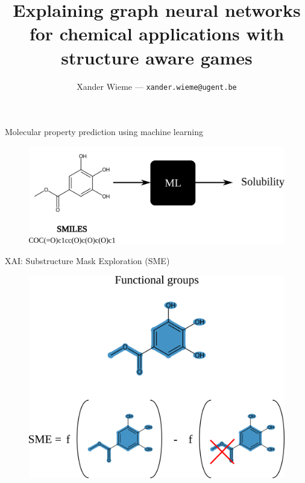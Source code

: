 \documentclass[aspectratio=169]{beamer}
\title{Explaining graph neural networks for chemical applications with structure aware games}
\subtitle{}
\author[DB]{Xander Wieme --- \texttt{xander.wieme@ugent.be}}
\date{}
\begin{document}

\logoframe

\titleframe



\begin{frame}{Molecular property prediction using machine learning}

    \begin{figure}[h]
        \centering 
        \includegraphics[scale=0.85]{./img/mpp.png}
    \end{figure}
   
\end{frame}


\begin{frame}{XAI: Substructure Mask Exploration (SME)}

    \begin{figure}[h]
        \centering 
        \includegraphics[scale=0.40]{./img/SME.png}
    \end{figure}
    
\end{frame}
\end{document}

